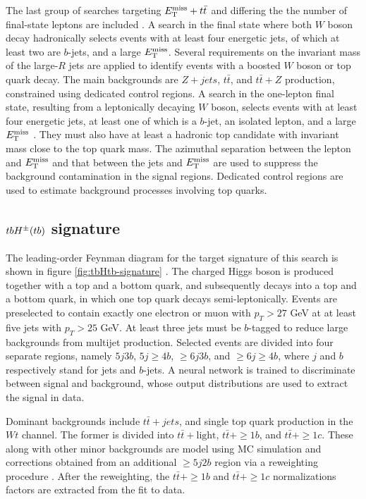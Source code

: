 The last group of searches targeting $E_{\mathrm{T}}^{\mathrm{miss}}+t\bar{t}$ and differing the the number of final-state leptons are included \cite{SUSY-2016-18}. A search in the final state where both $W$ boson decay hadronically selects events with at least four energetic jets, of which at least two are $b$-jets, and a large $E_{\mathrm{T}}^{\mathrm{miss}}$. Several requirements on the invariant mass of the large-$R$ jets are applied to identify events with a boosted $W$ boson or top quark decay. The main backgrounds are $Z+jets$, $t\bar{t}$, and $t\bar{t}+Z$ production, constrained using dedicated control regions. A search in the one-lepton final state, resulting from a leptonically decaying $W$ boson, selects events with at least four energetic jets, at least one of which is a $b$-jet, an isolated lepton, and a large $E_{\mathrm{T}}^{\mathrm{miss}}$ \cite{SUSY-2016-16}. They must also have at least a hadronic top candidate with invariant mass close to the top quark mass. The azimuthal separation between the lepton and $E_{\mathrm{T}}^{\mathrm{miss}}$ and that between the jets and $E_{\mathrm{T}}^{\mathrm{miss}}$ are used to suppress the background contamination in the signal regions. Dedicated control regions are used to estimate background processes involving top quarks.

\subsection{\texorpdfstring{$tbH^{\pm}(tb)$}{TEXT} signature}
\label{subsect:tbHtb}
The leading-order Feynman diagram for the target signature of this search is shown in figure \ref{fig:tbHtb-signature} \cite{HDBS-2018-51}. The charged Higgs boson is produced together with a top and a bottom quark, and subsequently decays into a top and a bottom quark, in which one top quark decays semi-leptonically. Events are preselected to contain exactly one electron or muon with $p_T>27$ GeV at at least five jets with $p_T>25$ GeV. At least three jets must be $b$-tagged to reduce large backgrounds from multijet production. Selected events are divided into four separate regions, namely $5j3b$, $5j\ge 4b$, $\ge 6j3b$, and $\ge 6j\ge 4b$, where $j$ and $b$ respectively stand for jets and $b$-jets. A neural network is trained to discriminate between signal and background, whose output distributions are used to extract the signal in data. 

Dominant backgrounds include $t\bar{t}+jets$, and single top quark production in the $Wt$ channel. The former is divided into $t\bar{t}+\mathrm{light}$, $t\bar{t}+\ge 1b$, and $t\bar{t}+\ge 1c$. These along with other minor backgrounds are model using MC simulation and corrections obtained from an additional $\ge 5j2b$ region via a reweighting procedure \cite{ATL-PHYS-PUB-2018-009, TOPQ-2018-18}. After the reweighting, the $t\bar{t}+\ge 1b$ and $t\bar{t}+ \ge 1c$ normalizations factors are extracted from the fit to data. 

